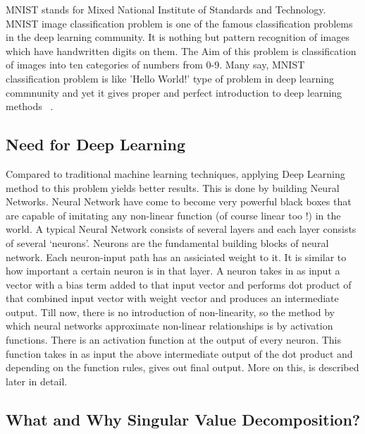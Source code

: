 MNIST stands for Mixed National Institute of Standards and Technology. MNIST
image classification problem is one of the famous classification problems in the
deep learning community. It is nothing but pattern recognition of images which
have handwritten digits on them. The Aim of this problem is classification of
images into ten categories of numbers from 0-9. Many say, MNIST classification
problem is like 'Hello World!' type of problem in deep learning commnunity and
yet it gives proper and perfect introduction to deep learning methods
~\cite{hid-sp18-401-mnist}.

\subsection{Need for Deep Learning}

Compared to traditional machine learning techniques, applying Deep Learning
method to this problem yields better results. This is done by building Neural
Networks. Neural Network have come to become very powerful black boxes that are
capable of imitating any non-linear function (of course linear too !) in the
world. A typical Neural Network consists of several layers and each layer
consists of several `neurons'. Neurons are the fundamental building blocks of
neural network.  Each neuron-input path has an assiciated weight to it. It is
similar to how important a certain neuron is in that layer. A neuron takes in as
input a vector with a bias term added to that input vector and performs dot
product of that combined input vector with weight vector and produces an
intermediate output. Till now, there is no introduction of non-linearity, so the
method by which neural networks approximate non-linear relationships is by
activation functions. There is an activation function at the output of every
neuron. This function takes in as input the above intermediate output of the dot
product and depending on the function rules, gives out final output. More on
this, is described later in detail.

\subsection{What and Why Singular Value Decomposition?}

